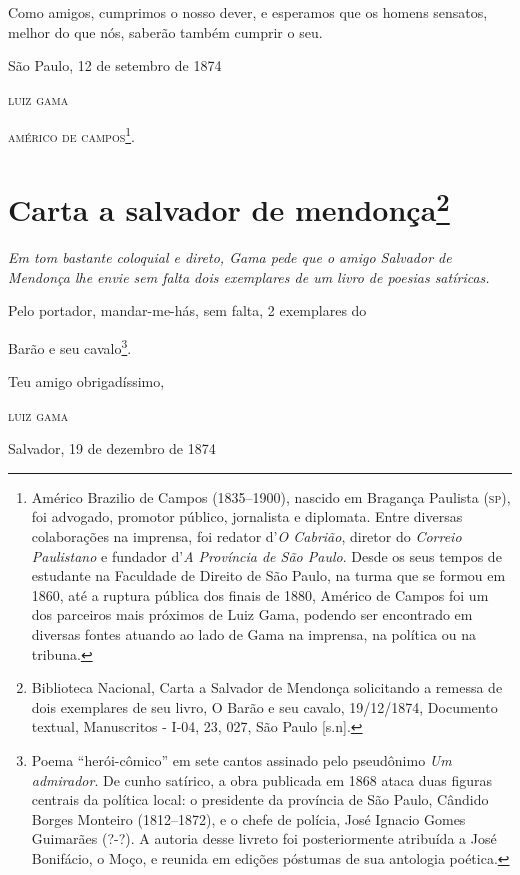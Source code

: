 Como amigos, cumprimos o nosso dever, e esperamos que os homens
sensatos, melhor do que nós, saberão também cumprir o seu.

\begin{flushright}
São Paulo, 12 de setembro de 1874

\textsc{luiz gama}
\end{flushright}

\textsc{américo de campos}\footnote{ Américo Brazilio de Campos (1835--1900),
  nascido em Bragança Paulista (\textsc{sp}), foi advogado, promotor público,
  jornalista e diplomata. Entre diversas colaborações na imprensa, foi
  redator d'\emph{O Cabrião}, diretor do \emph{Correio Paulistano} e
  fundador d'\emph{A Província de São Paulo}. Desde os seus tempos de
  estudante na Faculdade de Direito de São Paulo, na turma que se formou
  em 1860, até a ruptura pública dos finais de 1880, Américo de Campos
  foi um dos parceiros mais próximos de Luiz Gama, podendo ser
  encontrado em diversas fontes atuando ao lado de Gama na imprensa, na
  política ou na tribuna.}.

\chapter{Carta a salvador de mendonça\footnote{Biblioteca Nacional, Carta a Salvador de Mendonça
  solicitando a remessa de dois exemplares de seu livro, O Barão e seu
  cavalo, 19/12/1874, Documento textual, Manuscritos - I-04, 23, 027,
  São Paulo {[}s.n{]}.}} %

\begin{didascalia}
\emph{Em tom bastante coloquial e direto, Gama pede que o amigo Salvador
de Mendonça lhe envie sem falta dois exemplares de um livro de poesias
satíricas.}
\end{didascalia}

Pelo portador, mandar-me-hás, {sem falta}, 2 exemplares do

Barão e seu cavalo\footnote{ Poema ``herói-cômico'' em sete cantos
  assinado pelo pseudônimo \emph{Um admirador}. De cunho satírico, a
  obra publicada em 1868 ataca duas figuras centrais da política local:
  o presidente da província de São Paulo, Cândido Borges Monteiro
  (1812--1872), e o chefe de polícia, José Ignacio Gomes Guimarães (?-?).
  A autoria desse livreto foi posteriormente atribuída a José Bonifácio,
  o Moço, e reunida em edições póstumas de sua antologia poética.}.

\begin{flushright}
Teu amigo obrigadíssimo,

\textsc{luiz gama}

Salvador, 19 de dezembro de 1874
\end{flushright}

